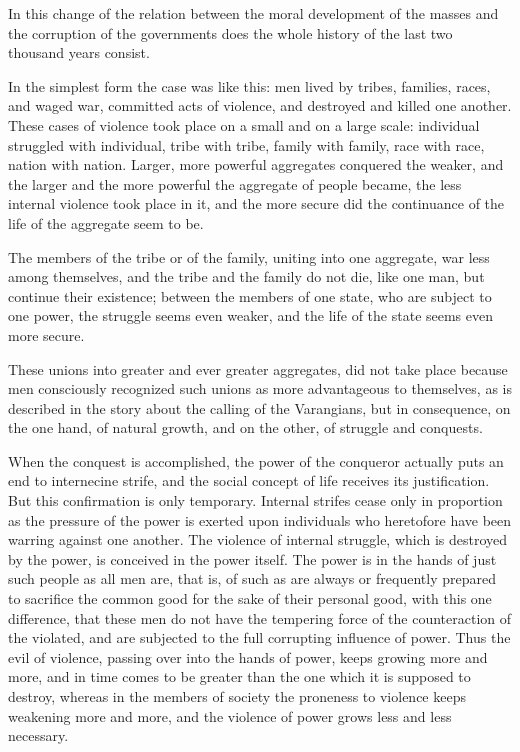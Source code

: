 \documentclass{book}
\begin{document}
In this change of the relation between the moral development of the masses and the corruption of the governments does the whole history of the last two thousand years consist.

In the simplest form the case was like this: men lived by tribes, families, races, and waged war, committed acts of violence, and destroyed and killed one another. These cases of violence took place on a small and on a large scale: individual struggled with individual, tribe with tribe, family with family, race with race, nation with nation. Larger, more powerful aggregates conquered the weaker, and the larger and the more powerful the aggregate of people became, the less internal violence took place in it, and the more secure did the continuance of the life of the aggregate seem to be.

The members of the tribe or of the family, uniting into one aggregate, war less among themselves, and the tribe and the family do not die, like one man, but continue their existence; between the members of one state, who are subject to one power, the struggle seems even weaker, and the life of the state seems even more secure.

These unions into greater and ever greater aggregates, did not take place because men consciously recognized such unions as more advantageous to themselves, as is described in the story about the calling of the Varangians, but in consequence, on the one hand, of natural growth, and on the other, of struggle and conquests.

When the conquest is accomplished, the power of the conqueror actually puts an end to internecine strife, and the social concept of life receives its justification. But this confirmation is only temporary. Internal strifes cease only in proportion as the pressure of the power is exerted upon individuals who heretofore have been warring against one another. The violence of internal struggle, which is destroyed by the power, is conceived in the power itself. The power is in the hands of just such people as all men are, that is, of such as are always or frequently prepared to sacrifice the common good for the sake of their personal good, with this one difference, that these men do not have the tempering force of the counteraction of the violated, and are subjected to the full corrupting influence of power. Thus the evil of violence, passing over into the hands of power, keeps growing more and more, and in time comes to be greater than the one which it is supposed to destroy, whereas in the members of society the proneness to violence keeps weakening more and more, and the violence of power grows less and less necessary.
\end{document}
